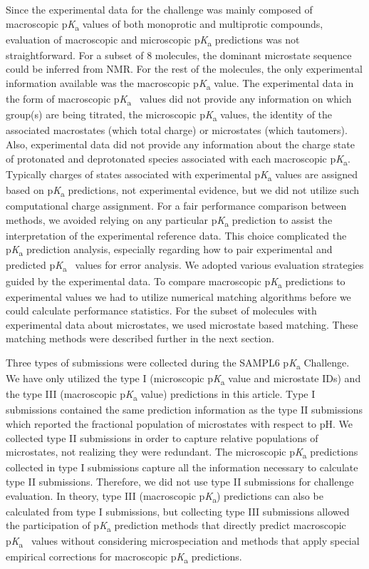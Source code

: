 \documentclass[9pt,lineno,final]{elife}
\newcommand{\pKa}{p\textit{K}\textsubscript{a}}
\begin{document}
Since the experimental data for the challenge was mainly composed of macroscopic \pKa{} values of both monoprotic and multiprotic compounds, evaluation of macroscopic and microscopic \pKa{} predictions was not straightforward. 
For a subset of 8 molecules, the dominant microstate sequence could be inferred from NMR. For the rest of the molecules, the only experimental information available was the macroscopic \pKa{} value.
The experimental data in the form of macroscopic \pKa{}~ values did not provide any information on which group(s) are being titrated, the microscopic \pKa{} values, the identity of the associated macrostates (which total charge) or microstates (which tautomers). 
Also, experimental data did not provide any information about the charge state of protonated and deprotonated species associated with each macroscopic \pKa{}. 
Typically charges of states associated with experimental \pKa{} values are assigned based on \pKa{} predictions, not experimental evidence, but we did not utilize such computational charge assignment.
For a fair performance comparison between methods, we avoided relying on any particular \pKa{} prediction to assist the interpretation of the experimental reference data.
This choice complicated the \pKa{} prediction analysis, especially regarding how to pair experimental and predicted \pKa{}~ values for error analysis.
We adopted various evaluation strategies guided by the experimental data. 
To compare macroscopic \pKa{} predictions to experimental values we had to utilize numerical matching algorithms before we could calculate performance statistics. 
For the subset of molecules with experimental data about microstates, we used microstate based matching. These matching methods were described further in the next section.

Three types of submissions were collected during the SAMPL6 \pKa{} Challenge. We have only utilized the type I (microscopic \pKa{} value and microstate IDs) and the type III (macroscopic \pKa{} value) predictions in this article. 
Type I submissions contained the same prediction information as the type II submissions which reported the fractional population of microstates with respect to pH.
We collected type II submissions in order to capture relative populations of microstates, not realizing they were redundant.  
The microscopic \pKa{} predictions collected in type I submissions capture all the information necessary to calculate type II submissions. 
Therefore, we did not use type II submissions for challenge evaluation. 
In theory, type III (macroscopic \pKa{}) predictions can also be calculated from type I submissions, but collecting type III submissions allowed the participation of \pKa{} prediction methods that directly predict macroscopic \pKa{}~ values without considering microspeciation and methods that apply special empirical corrections for macroscopic \pKa{} predictions.
\end{document}
